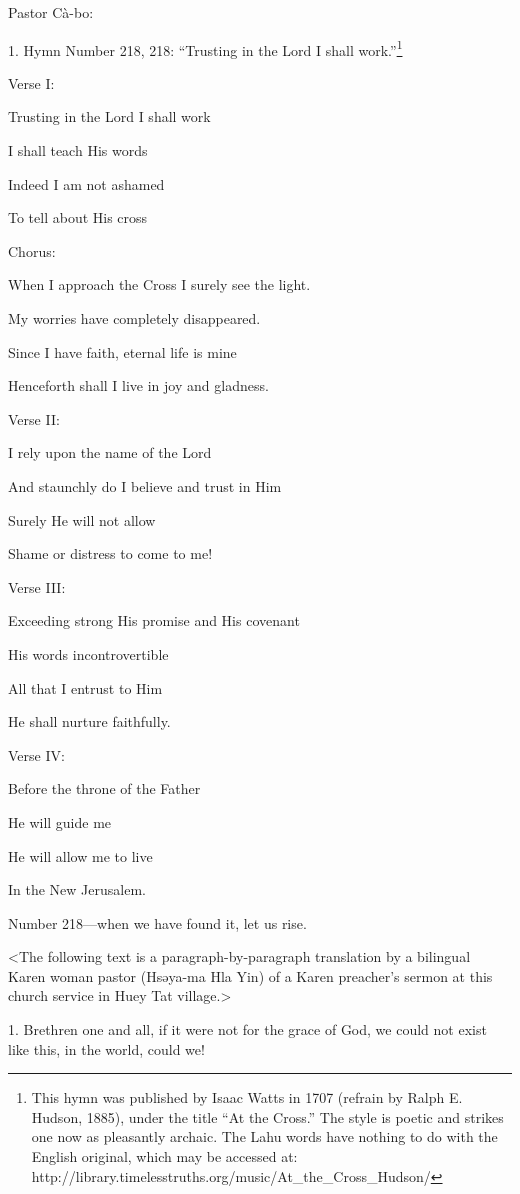 \setcounter{footnote}{0}

Pastor Cà-bo:

1. Hymn Number 218, 218: ``Trusting in the Lord I shall work.''\footnote{This hymn was published by Isaac Watts in 1707 (refrain by Ralph E. Hudson, 1885), under the title ``At the Cross.'' The style is poetic and strikes one now as pleasantly archaic. The Lahu words have nothing to do with the English original, which may be accessed at: http://library.timelesstruths.org/music/At\_the\_Cross\_Hudson/}

Verse I:

Trusting in the Lord I shall work

I shall teach His words

Indeed I am not ashamed

To tell about His cross

Chorus:

When I approach the Cross I surely see the light.

My worries have completely disappeared.

Since I have faith, eternal life is mine

Henceforth shall I live in joy and gladness.

Verse II:

I rely upon the name of the Lord

And staunchly do I believe and trust in Him

Surely He will not allow

Shame or distress to come to me!

Verse III:

Exceeding strong His promise and His covenant

His words incontrovertible

All that I entrust to Him

He shall nurture faithfully.

Verse IV:

Before the throne of the Father

He will guide me

He will allow me to live

In the New Jerusalem.

Number 218---when we have found it, let us rise.

<The following text is a paragraph-by-paragraph translation by a bilingual
Karen woman pastor (Hsəya-ma Hla Yin) of a Karen preacher's sermon at this church
service in Huey Tat village.>

1. Brethren one and all, if it were not for the grace of God, we could not exist
like this, in the world, could we!


